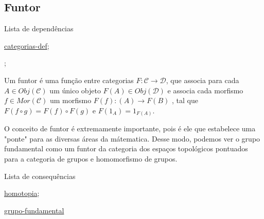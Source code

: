 \subsection{Funtor}
\label{funtor-categorias-def}
\begin{titlemize}{Lista de dependências}
	\item \hyperref[categorias-def]{categorias-def};\\ %
	\item \hyperref[]{};\\
\end{titlemize}
\begin{defi}
	Um funtor é uma função entre categorias $F: \mathcal{C} \longrightarrow \mathcal{D}$, que associa para cada $A \in Obj(\mathcal{C})$ um único objeto $F(A) \in Obj(\mathcal{D})$ e associa cada morfismo $f \in Mor(\mathcal{C})$ um morfismo $F(f): (A) \longrightarrow F(B)$ , tal que $F(f \circ g) = F(f) \circ F(g) $ e $F(1_A) = 1_{F(A)}$.
\end{defi}

O conceito de funtor é extremamente importante, pois é ele que estabelece uma "ponte" para as diversas áreas da mátematica. Desse modo, podemos ver o grupo fundamental como um funtor da categoria dos espaços topológicos pontuados para a categoria de grupos e homomorfismo de grupos.

\begin{titlemize}{Lista de consequências}
	\item \hyperref[homotopia]{homotopia};\\ %
	\item \hyperref[grupo-fundamental]{grupo-fundamental}
\end{titlemize}

